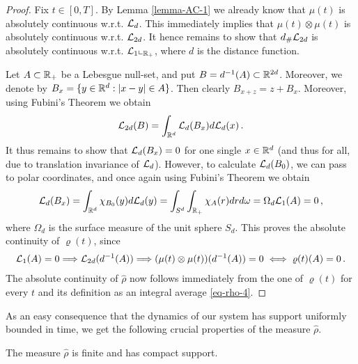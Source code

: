 \begin{proof}
	Fix $t\in [0,T]$. By Lemma \ref{lemma-AC-1} we already know that $\mu(t)$ is absolutely continuous w.r.t.
	$\mathcal{L}_d$. This immediately implies that $\mu(t)\otimes\mu(t)$ is absolutely continuous w.r.t. $\mathcal{L}_{2d}$. It hence
	remains to show that $d_{\#}\mathcal{L}_{2d}$ is absolutely continuous w.r.t. $\mathcal{L}_1\llcorner_{\mathbb{R}_+}$, where $d$ is the distance function.
	
	Let $A\subset\mathbb{R}_+$ be a Lebesgue null-set, and put $B=d^{-1}(A)\subset\mathbb{R}^{2d}$. Moreover, we denote by
	$B_x=\{y\in\mathbb{R}^d:|x-y|\in A\}$. Then clearly $B_{x+z}=z+B_x$. Moreover, using Fubini's Theorem we obtain
	\begin{align*}
		\mathcal{L}_{2d}(B)=\int_{\mathbb{R}^d}\mathcal{L}_d(B_x)d\mathcal{L}_d(x)\,.
	\end{align*}
	It thus remains to show that $\mathcal{L}_d(B_x)=0$ for one single $x\in\mathbb{R}^d$ (and thus for all, due to translation invariance of $\mathcal{L}_d$).
	However, to calculate $\mathcal{L}_d(B_0)$, we can pass to polar coordinates, and once again using Fubini's Theorem
	we obtain
	\begin{align*}
		\mathcal{L}_d(B_x)=\int_{\mathbb{R}^d}\chi_{B_0}(y)d\mathcal{L}_d(y)
			=\int_{S^d}\int_{\mathbb{R}_+}\chi_A(r)dr d\omega=\Omega_d\mathcal{L}_1(A)=0\,,
	\end{align*}
	where $\Omega_d$ is the surface measure of the unit sphere $S_d$. This proves the absolute continuity of
	$\varrho(t)$, since
	\begin{align*}
		\mathcal{L}_1(A)=0\Longrightarrow\mathcal{L}_{2d}(d^{-1}(A))
			\Longrightarrow (\mu(t)\otimes\mu(t))(d^{-1}(A))=0\iff\varrho(t)(A)=0\,.
	\end{align*}
	The absolute continuity of $\widehat \rho$ now follows immediately from the one of $\varrho(t)$ for every $t$ and its
	definition as an integral average \eqref{eq-rho-4}.
\end{proof}

As an easy consequence that the dynamics of our system has support uniformly bounded in time, we get the following crucial properties of the measure $\widehat \rho$.

\begin{lemma}\label{rhocompact}
	The measure $\widehat \rho$ is finite and has compact support.
\end{lemma}

